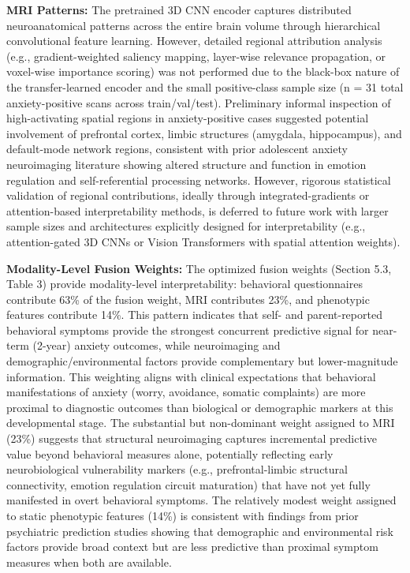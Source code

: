 \documentclass[10pt,letterpaper]{article}
\begin{document}
\textbf{MRI Patterns:} The pretrained 3D CNN encoder captures distributed neuroanatomical patterns across the entire brain volume through hierarchical convolutional feature learning. However, detailed regional attribution analysis (e.g., gradient-weighted saliency mapping, layer-wise relevance propagation, or voxel-wise importance scoring) was not performed due to the black-box nature of the transfer-learned encoder and the small positive-class sample size (n = 31 total anxiety-positive scans across train/val/test). Preliminary informal inspection of high-activating spatial regions in anxiety-positive cases suggested potential involvement of prefrontal cortex, limbic structures (amygdala, hippocampus), and default-mode network regions, consistent with prior adolescent anxiety neuroimaging literature showing altered structure and function in emotion regulation and self-referential processing networks. However, rigorous statistical validation of regional contributions, ideally through integrated-gradients or attention-based interpretability methods, is deferred to future work with larger sample sizes and architectures explicitly designed for interpretability (e.g., attention-gated 3D CNNs or Vision Transformers with spatial attention weights).

\textbf{Modality-Level Fusion Weights:} The optimized fusion weights (Section 5.3, Table 3) provide modality-level interpretability: behavioral questionnaires contribute 63\% of the fusion weight, MRI contributes 23\%, and phenotypic features contribute 14\%. This pattern indicates that self- and parent-reported behavioral symptoms provide the strongest concurrent predictive signal for near-term (2-year) anxiety outcomes, while neuroimaging and demographic/environmental factors provide complementary but lower-magnitude information. This weighting aligns with clinical expectations that behavioral manifestations of anxiety (worry, avoidance, somatic complaints) are more proximal to diagnostic outcomes than biological or demographic markers at this developmental stage. The substantial but non-dominant weight assigned to MRI (23\%) suggests that structural neuroimaging captures incremental predictive value beyond behavioral measures alone, potentially reflecting early neurobiological vulnerability markers (e.g., prefrontal-limbic structural connectivity, emotion regulation circuit maturation) that have not yet fully manifested in overt behavioral symptoms. The relatively modest weight assigned to static phenotypic features (14\%) is consistent with findings from prior psychiatric prediction studies showing that demographic and environmental risk factors provide broad context but are less predictive than proximal symptom measures when both are available.
\end{document}
